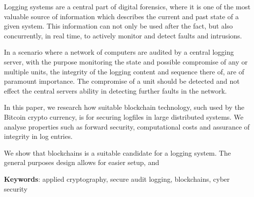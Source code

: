 
Logging systems are a central part of digital forensics, where it
is one of the most valuable source of information which describes
the current and past state of a given system. This information
can not only be used after the fact, but also concurrently, in
real time, to actively monitor and detect faults and intrusions.

In a scenario where a network of computers are audited by a
central logging server, with the purpose monitoring the state and
possible compromise of any or multiple units, the integrity of
the logging content and sequence there of, are of paramount
importance. The compromise of a unit should be detected and not
effect the central servers ability in detecting further faults
in the network.

In this paper, we research how suitable blockchain technology,
such used by the Bitcoin crypto currency, is for securing
logfiles in large distributed systems. We analyse properties such
as forward security, computational costs and assurance of
integrity in log entries.

We show that blockchains is a suitable candidate for a logging system. 
The general purposes design allows for easier setup, and 


\textbf{Keywords}: applied cryptography, secure audit logging,
blockchains, cyber security

